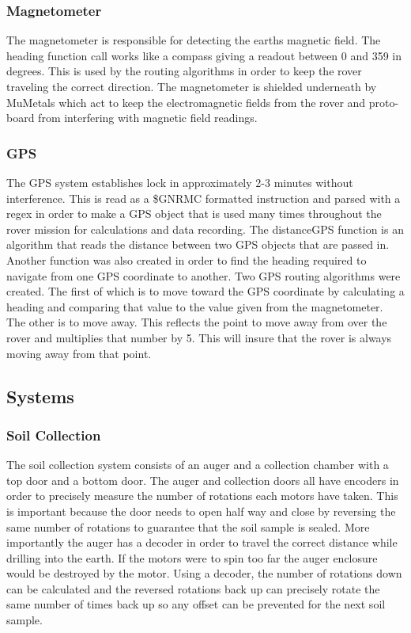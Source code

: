 \documentclass[journal,10pt,draftclsnofoot,onecolumn,compsoc]{IEEEtran} \usepackage[margin=0.75in]{geometry}
\begin{document}
\subsubsection{Magnetometer}
The magnetometer is responsible for detecting the earths magnetic field. The heading function call works like a compass giving a readout between 0 and 359 in degrees. This is used by the routing algorithms in order to keep the rover traveling the correct direction. The magnetometer is shielded underneath by MuMetals which act to keep the electromagnetic fields from the rover and proto-board from interfering with magnetic field readings. 

\subsubsection{GPS}
The GPS system establishes lock in approximately 2-3 minutes without interference. This is read as a \$GNRMC formatted instruction and parsed with a regex in order to make a GPS object that is used many times throughout the rover mission for calculations and data recording. The distanceGPS function is an algorithm that reads the distance between two GPS objects that are passed in. Another function was also created in order to find the heading required to navigate from one GPS coordinate to another. Two GPS routing algorithms were created. The first of which is to move toward the GPS coordinate by calculating a heading and comparing that value to the value given from the magnetometer. The other is to move away. This reflects the point to move away from over the rover and multiplies that number by 5. This will insure that the rover is always moving away from that point. 

\subsection{Systems}
\subsubsection{Soil Collection}
The soil collection system consists of an auger and a collection chamber with a top door and a bottom door. The auger and collection doors all have encoders in order to precisely measure the number of rotations each motors have taken. This is important because the door needs to open half way and close by reversing the same number of rotations to guarantee that the soil sample is sealed. More importantly the auger has a decoder in order to travel the correct distance while drilling into the earth. If the motors were to spin too far the auger enclosure would be destroyed by the motor. Using a decoder, the number of rotations down can be calculated and the reversed rotations back up can precisely rotate the same number of times back up so any offset can be prevented for the next soil sample. 
\end{document}
